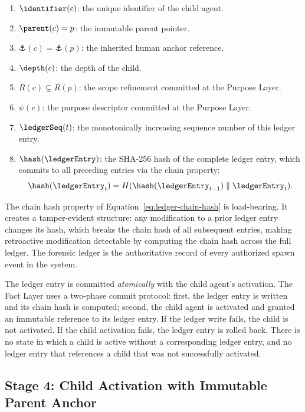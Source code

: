 \begin{enumerate}
    \item $\identifier(c)$: the unique identifier of the child agent.
    \item $\parent(c) = p$: the immutable parent pointer.
    \item $\anchor(c) = \anchor(p)$: the inherited human anchor reference.
    \item $\depth(c)$: the depth of the child.
    \item $R(c) \subsetneq R(p)$: the scope refinement committed at the Purpose Layer.
    \item $\psi(c)$: the purpose descriptor committed at the Purpose Layer.
    \item $\ledgerSeq(t)$: the monotonically increasing sequence number of this ledger entry.
    \item $\hash(\ledgerEntry)$: the SHA-256 hash of the complete ledger entry, which commits to all preceding entries via the chain property:
    \begin{equation}
    \hash(\ledgerEntry_t) = H(\hash(\ledgerEntry_{t-1}) \parallel \ledgerEntry_t).
    \label{eq:ledger-chain-hash}
    \end{equation}
\end{enumerate}

The chain hash property of Equation~\eqref{eq:ledger-chain-hash} is load-bearing. It creates a tamper-evident structure: any modification to a prior ledger entry changes its hash, which breaks the chain hash of all subsequent entries, making retroactive modification detectable by computing the chain hash across the full ledger. The forensic ledger is the authoritative record of every authorized spawn event in the system.

The ledger entry is committed \emph{atomically} with the child agent's activation. The Fact Layer uses a two-phase commit protocol: first, the ledger entry is written and its chain hash is computed; second, the child agent is activated and granted an immutable reference to its ledger entry. If the ledger write fails, the child is not activated. If the child activation fails, the ledger entry is rolled back. There is no state in which a child is active without a corresponding ledger entry, and no ledger entry that references a child that was not successfully activated.

\subsection{Stage 4: Child Activation with Immutable Parent Anchor}
\label{sec:rs-protocol-child-activation}

